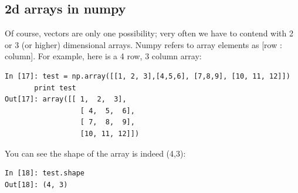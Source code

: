\subsection{2d arrays in numpy}
Of course, vectors are only one possibility; very often we have to contend with 2 or 3 (or higher) dimensional arrays. 
Numpy refers to array elements as [row : column]. For example, here is a 4 row, 3 column array:
\begin{lstlisting}
In [17]: test = np.array([[1, 2, 3],[4,5,6], [7,8,9], [10, 11, 12]])
   	   print test
Out[17]: array([[ 1,  2,  3],
                  [ 4,  5,  6],
                  [ 7,  8,  9],
                  [10, 11, 12]])
\end{lstlisting}	   
You can see the shape of the array is indeed (4,3):
\begin{lstlisting}
In [18]: test.shape
Out[18]: (4, 3)
\end{lstlisting}

